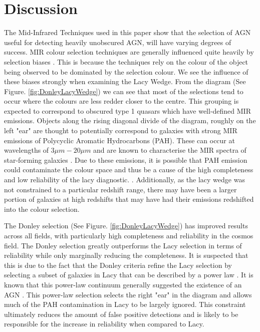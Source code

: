 \documentclass[11pt]{iopart}
\begin{document}
\section{Discussion}
The Mid-Infrared Techniques used in this paper show that the selection of AGN useful for detecting heavily unobscured AGN, will have varying degrees of success. MIR colour selection techniques are generally influenced quite heavily by selection biases \cite{lacy_optical_2007}. This is because the techniques rely on the colour of the object being observed to be dominated by the selection colour. We see the influence of these biases strongly when examining the Lacy Wedge. From the diagram (See Figure. \ref{fig:DonleyLacyWedge}) we can see that most of the selections tend to occur where the colours are less redder closer to the centre. This grouping is expected to correspond to obscured type 1 quasars which have well-defined MIR emissions\cite{lacy_optical_2007}. Objects along the rising diagonal divide of the diagram, roughly on the left "ear" are thought to potentially correspond to galaxies with strong MIR emissions of Polycyclic Aromatic Hydrocarbons (PAH)\cite{lacy_optical_2007, sajina_simulating_2005}. These can occur at wavelengths of $3\mu m-20\mu m$ and are known to characterise the MIR spectra of star-forming galaxies \cite{langeroodi_pah_2023}. Due to these emissions, it is possible that PAH emission could contaminate the colour space and thus be a cause of the high completeness and low reliability of the lacy diagnostic. \cite{hickox_obscured_2018}. Additionally, as the lacy wedge was not constrained to a particular redshift range, there may have been a larger portion of galaxies at high redshifts that may have had their emissions redshifted into the colour selection. \par The Donley selection (See Figure. \ref{fig:DonleyLacyWedge}) has improved results across all fields, with particularly high completeness and reliability in the cosmos field. The Donley selection greatly outperforms the Lacy selection in terms of reliability while only marginally reducing the completeness. It is suspected that this is due to the fact that the Donley criteria refine the Lacy selection by selecting a subset of galaxies in Lacy that can be described by a power law \cite{alonsoherrero_infrared_2006, donley_identifying_2012}. It is known that this power-law continuum generally suggested the existence of an AGN \cite{elvis_atlas_1994}. This power-law selection selects the right "ear" in the diagram and allows much of the PAH contamination in Lacy to be largely ignored. This constraint ultimately reduces the amount of false positive detections and is likely to be responsible for the increase in reliability when compared to Lacy. \par 
\end{document}
